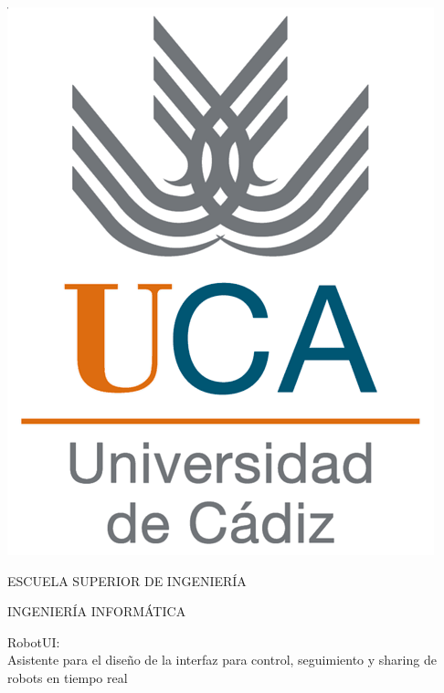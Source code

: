 


\pagestyle{empty}
\begin{center}

  \includegraphics[scale=0.2]{inicio/logo_uca.png} \\

  \vspace{2.0cm}

  \Large{ESCUELA SUPERIOR DE INGENIERÍA} \\

  \vspace{1.0cm}

  \large{INGENIERÍA INFORMÁTICA} \\

  \vspace{2.0cm}

  \large{RobotUI: \\Asistente para el diseño de la interfaz  para control, seguimiento y sharing de robots en tiempo real} \\

  \vspace{1.0cm}

\end{center}

